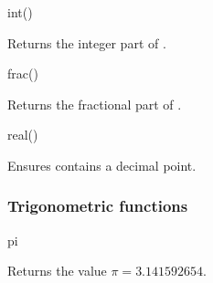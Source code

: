 \begin{math-function}{int()}
\mathcommand

	Returns the integer part of . 

\begin{codeexample}[]
 \pgfmathresult
\end{codeexample}

\end{math-function}

\begin{math-function}{frac()}
\mathcommand

	Returns the fractional part of . 

\begin{codeexample}[]
 \pgfmathresult
\end{codeexample}

\end{math-function}

\begin{math-function}{real()}
\mathcommand

	Ensures  contains a decimal point. 

\begin{codeexample}[]
 \pgfmathresult
\end{codeexample}

\end{math-function}




\subsubsection{Trigonometric functions}

\label{pgfmath-functions-trigonometric}

\begin{math-function}{pi}
\mathcommand

	Returns the value $\pi=3.141592654$.
	
\begin{codeexample}[]
 \pgfmathresult
\end{codeexample}

\begin{codeexample}[]
 \pgfmathresult
\end{codeexample}

\end{math-function}

